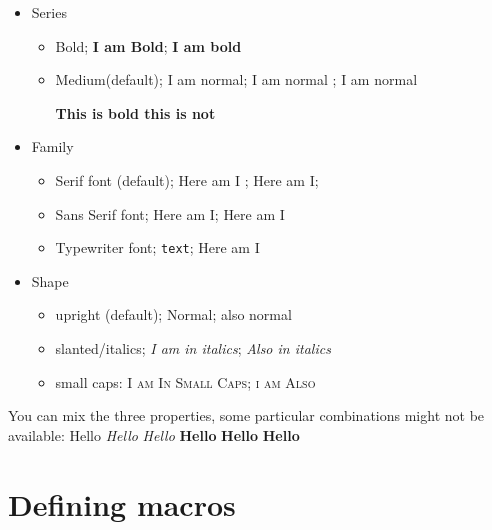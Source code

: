 \documentclass[a4paper]{article}
\begin{document}
\begin{itemize}

\item Series 

  \begin{itemize}
    \item Bold; \textbf{I am Bold}; {\bfseries I am bold}

    \item Medium(default); \textmd{ I am normal}; {\mdseries I am normal} ; {\mdseries I am normal}

      \textbf{ This is bold \textmd{this is not} } 
  
  \end{itemize}

\item Family

  \begin{itemize} 
    \item Serif font (default); \textrm{Here am I }; {\rmfamily Here am I};

    \item Sans Serif font; \textsf{Here am I}; {\sffamily Here am I}
    
    \item Typewriter font; \texttt{text}; {\ttfamily Here am I }

  \end{itemize}

\item Shape

  \begin{itemize}
    \item upright (default); \textup{Normal}; {\upshape also normal}
    \item slanted/italics; \textit{I am in italics}; {\itshape Also in italics}
    \item small caps: \textsc{I am In Small Caps}; {\scshape i am Also}
  \end{itemize}

\end{itemize}

You can mix the three properties, some particular combinations might not be available: {Hello} {\ttfamily \itshape Hello} {\sffamily \itshape Hello} {\sffamily \bfseries Hello} {\bfseries Hello} {\ttfamily \bfseries Hello} {}

\section{Defining macros}
\end{document}
